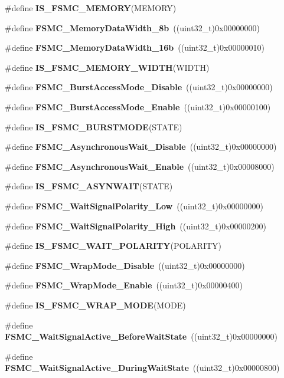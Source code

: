 \begin{DoxyCompactItemize}
\item 
\#define \textbf{ I\+S\+\_\+\+F\+S\+M\+C\+\_\+\+M\+E\+M\+O\+RY}(M\+E\+M\+O\+RY)
\item 
\#define \textbf{ F\+S\+M\+C\+\_\+\+Memory\+Data\+Width\+\_\+8b}~((uint32\+\_\+t)0x00000000)
\item 
\#define \textbf{ F\+S\+M\+C\+\_\+\+Memory\+Data\+Width\+\_\+16b}~((uint32\+\_\+t)0x00000010)
\item 
\#define \textbf{ I\+S\+\_\+\+F\+S\+M\+C\+\_\+\+M\+E\+M\+O\+R\+Y\+\_\+\+W\+I\+D\+TH}(W\+I\+D\+TH)
\item 
\#define \textbf{ F\+S\+M\+C\+\_\+\+Burst\+Access\+Mode\+\_\+\+Disable}~((uint32\+\_\+t)0x00000000)
\item 
\#define \textbf{ F\+S\+M\+C\+\_\+\+Burst\+Access\+Mode\+\_\+\+Enable}~((uint32\+\_\+t)0x00000100)
\item 
\#define \textbf{ I\+S\+\_\+\+F\+S\+M\+C\+\_\+\+B\+U\+R\+S\+T\+M\+O\+DE}(S\+T\+A\+TE)
\item 
\#define \textbf{ F\+S\+M\+C\+\_\+\+Asynchronous\+Wait\+\_\+\+Disable}~((uint32\+\_\+t)0x00000000)
\item 
\#define \textbf{ F\+S\+M\+C\+\_\+\+Asynchronous\+Wait\+\_\+\+Enable}~((uint32\+\_\+t)0x00008000)
\item 
\#define \textbf{ I\+S\+\_\+\+F\+S\+M\+C\+\_\+\+A\+S\+Y\+N\+W\+A\+IT}(S\+T\+A\+TE)
\item 
\#define \textbf{ F\+S\+M\+C\+\_\+\+Wait\+Signal\+Polarity\+\_\+\+Low}~((uint32\+\_\+t)0x00000000)
\item 
\#define \textbf{ F\+S\+M\+C\+\_\+\+Wait\+Signal\+Polarity\+\_\+\+High}~((uint32\+\_\+t)0x00000200)
\item 
\#define \textbf{ I\+S\+\_\+\+F\+S\+M\+C\+\_\+\+W\+A\+I\+T\+\_\+\+P\+O\+L\+A\+R\+I\+TY}(P\+O\+L\+A\+R\+I\+TY)
\item 
\#define \textbf{ F\+S\+M\+C\+\_\+\+Wrap\+Mode\+\_\+\+Disable}~((uint32\+\_\+t)0x00000000)
\item 
\#define \textbf{ F\+S\+M\+C\+\_\+\+Wrap\+Mode\+\_\+\+Enable}~((uint32\+\_\+t)0x00000400)
\item 
\#define \textbf{ I\+S\+\_\+\+F\+S\+M\+C\+\_\+\+W\+R\+A\+P\+\_\+\+M\+O\+DE}(M\+O\+DE)
\item 
\#define \textbf{ F\+S\+M\+C\+\_\+\+Wait\+Signal\+Active\+\_\+\+Before\+Wait\+State}~((uint32\+\_\+t)0x00000000)
\item 
\#define \textbf{ F\+S\+M\+C\+\_\+\+Wait\+Signal\+Active\+\_\+\+During\+Wait\+State}~((uint32\+\_\+t)0x00000800)
\item 

\end{DoxyCompactItemize}
